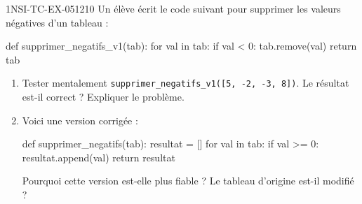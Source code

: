 \begin{exercice}{1NSI-TC-EX-051}{2}{10}
Un élève écrit le code suivant pour supprimer les valeurs négatives d'un tableau :
\begin{python}
def supprimer_negatifs_v1(tab):
    for val in tab:
        if val < 0:
            tab.remove(val)
    return tab
\end{python}
\begin{enumerate}
  \item Tester mentalement \lstinline{supprimer_negatifs_v1([5, -2, -3, 8])}.
        Le résultat est-il correct ? Expliquer le problème.
  \item Voici une version corrigée :
\begin{python}
def supprimer_negatifs(tab):
    resultat = []
    for val in tab:
        if val >= 0:
            resultat.append(val)
    return resultat
\end{python}
        Pourquoi cette version est-elle plus fiable ? Le tableau d'origine
        est-il modifié ?
\end{enumerate}
\end{exercice}
